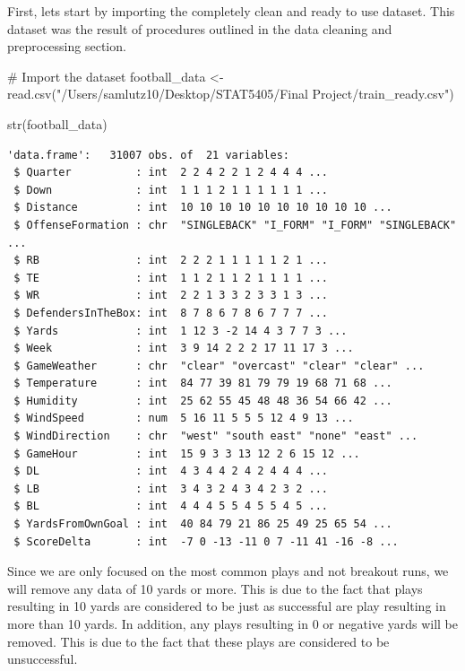 \documentclass[
  super,
  preprint,
  3p]{elsarticle}
\newenvironment{Shaded}{\begin{snugshade}}{\end{snugshade}}
\newcommand{\CommentTok}[1]{\textcolor[rgb]{0.37,0.37,0.37}{#1}}
\newcommand{\FunctionTok}[1]{\textcolor[rgb]{0.28,0.35,0.67}{#1}}
\newcommand{\NormalTok}[1]{\textcolor[rgb]{0.00,0.23,0.31}{#1}}
\newcommand{\OtherTok}[1]{\textcolor[rgb]{0.00,0.23,0.31}{#1}}
\newcommand{\StringTok}[1]{\textcolor[rgb]{0.13,0.47,0.30}{#1}}
\begin{document}
First, lets start by importing the completely clean and ready to use
dataset. This dataset was the result of procedures outlined in the data
cleaning and preprocessing section.

\begin{Shaded}
\begin{Highlighting}[]
\CommentTok{\# Import the dataset}
\NormalTok{football\_data }\OtherTok{\textless{}{-}} \FunctionTok{read.csv}\NormalTok{(}\StringTok{"/Users/samlutz10/Desktop/STAT5405/Final Project/train\_ready.csv"}\NormalTok{)}

\FunctionTok{str}\NormalTok{(football\_data)}
\end{Highlighting}
\end{Shaded}

\begin{verbatim}
'data.frame':   31007 obs. of  21 variables:
 $ Quarter          : int  2 2 4 2 2 1 2 4 4 4 ...
 $ Down             : int  1 1 1 2 1 1 1 1 1 1 ...
 $ Distance         : int  10 10 10 10 10 10 10 10 10 10 ...
 $ OffenseFormation : chr  "SINGLEBACK" "I_FORM" "I_FORM" "SINGLEBACK" ...
 $ RB               : int  2 2 2 1 1 1 1 1 2 1 ...
 $ TE               : int  1 1 2 1 1 2 1 1 1 1 ...
 $ WR               : int  2 2 1 3 3 2 3 3 1 3 ...
 $ DefendersInTheBox: int  8 7 8 6 7 8 6 7 7 7 ...
 $ Yards            : int  1 12 3 -2 14 4 3 7 7 3 ...
 $ Week             : int  3 9 14 2 2 2 17 11 17 3 ...
 $ GameWeather      : chr  "clear" "overcast" "clear" "clear" ...
 $ Temperature      : int  84 77 39 81 79 79 19 68 71 68 ...
 $ Humidity         : int  25 62 55 45 48 48 36 54 66 42 ...
 $ WindSpeed        : num  5 16 11 5 5 5 12 4 9 13 ...
 $ WindDirection    : chr  "west" "south east" "none" "east" ...
 $ GameHour         : int  15 9 3 3 13 12 2 6 15 12 ...
 $ DL               : int  4 3 4 4 2 4 2 4 4 4 ...
 $ LB               : int  3 4 3 2 4 3 4 2 3 2 ...
 $ BL               : int  4 4 4 5 5 4 5 5 4 5 ...
 $ YardsFromOwnGoal : int  40 84 79 21 86 25 49 25 65 54 ...
 $ ScoreDelta       : int  -7 0 -13 -11 0 7 -11 41 -16 -8 ...
\end{verbatim}

Since we are only focused on the most common plays and not breakout
runs, we will remove any data of 10 yards or more. This is due to the
fact that plays resulting in 10 yards are considered to be just as
successful are play resulting in more than 10 yards. In addition, any
plays resulting in 0 or negative yards will be removed. This is due to
the fact that these plays are considered to be unsuccessful.
\end{document}
